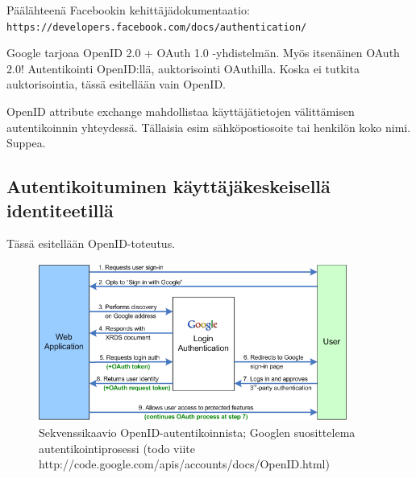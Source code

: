 \documentclass[finnish,gradu]{tktltiki}
\begin{document}
  Päälähteenä Facebookin kehittäjädokumentaatio:
  \\ \verb!https://developers.facebook.com/docs/authentication/!



  Google tarjoaa OpenID 2.0 + OAuth 1.0 -yhdistelmän. Myös itsenäinen OAuth 2.0!  Autentikointi OpenID:llä, auktorisointi OAuthilla. Koska ei tutkita auktorisointia, tässä esitellään vain OpenID.

  OpenID attribute exchange mahdollistaa käyttäjätietojen välittämisen autentikoinnin yhteydessä. Tällaisia esim sähköpostiosoite tai henkilön koko nimi. Suppea.



  \subsection{Autentikoituminen käyttäjäkeskeisellä identiteetillä} %
  \label{sub:autentikoituminen_käyttäjäkeskeisellä_identiteetillä}

  Tässä esitellään OpenID-toteutus.

  \begin{figure}
    \centering
    \includegraphics[width=0.9\textwidth]{images/google_openid_diagram.png}
    \caption{Sekvenssikaavio OpenID-autentikoinnista; Googlen suosittelema autentikointiprosessi (todo viite http://code.google.com/apis/accounts/docs/OpenID.html)}
    \label{fig:sekvenssikaavio_google_openid}
  \end{figure}
\end{document}
